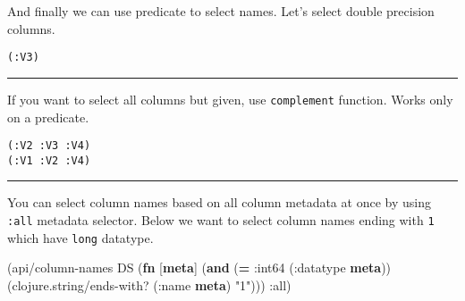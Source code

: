 \documentclass[]{article}
\newenvironment{Shaded}{\begin{snugshade}}{\end{snugshade}}
\newcommand{\KeywordTok}[1]{\textcolor[rgb]{0.13,0.29,0.53}{\textbf{#1}}}
\newcommand{\StringTok}[1]{\textcolor[rgb]{0.31,0.60,0.02}{#1}}
\newcommand{\VariableTok}[1]{\textcolor[rgb]{0.00,0.00,0.00}{#1}}
\newcommand{\AttributeTok}[1]{\textcolor[rgb]{0.77,0.63,0.00}{#1}}
\newcommand{\NormalTok}[1]{#1}
\begin{document}
And finally we can use predicate to select names. Let's select double
precision columns.

\begin{Shaded}
\end{Shaded}

\begin{verbatim}
(:V3)
\end{verbatim}

\begin{center}\rule{0.5\linewidth}{0.5pt}\end{center}

If you want to select all columns but given, use \texttt{complement}
function. Works only on a predicate.

\begin{Shaded}
\end{Shaded}

\begin{verbatim}
(:V2 :V3 :V4)
(:V1 :V2 :V4)
\end{verbatim}

\begin{center}\rule{0.5\linewidth}{0.5pt}\end{center}

You can select column names based on all column metadata at once by
using \texttt{:all} metadata selector. Below we want to select column
names ending with \texttt{1} which have \texttt{long} datatype.

\begin{Shaded}
\begin{Highlighting}[]
\NormalTok{(api/column-names DS (}\KeywordTok{fn}\NormalTok{ [}\KeywordTok{meta}\NormalTok{]}
\NormalTok{                       (}\KeywordTok{and}\NormalTok{ (}\KeywordTok{=} \AttributeTok{:int64}\NormalTok{ (}\AttributeTok{:datatype} \KeywordTok{meta}\NormalTok{))}
\NormalTok{                            (clojure.string/ends-with? (}\AttributeTok{:name} \KeywordTok{meta}\NormalTok{) }\StringTok{"1"}\NormalTok{))) }\AttributeTok{:all}\NormalTok{)}
\end{Highlighting}
\end{Shaded}
\end{document}
